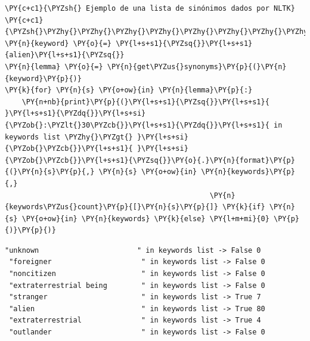     \begin{tcolorbox}[breakable, size=fbox, boxrule=1pt, pad at break*=1mm,colback=cellbackground, colframe=cellborder]
\begin{Verbatim}[commandchars=\\\{\}]
\PY{c+c1}{\PYZsh{} Ejemplo de una lista de sinónimos dados por NLTK}
\PY{c+c1}{\PYZsh{}\PYZhy{}\PYZhy{}\PYZhy{}\PYZhy{}\PYZhy{}\PYZhy{}\PYZhy{}\PYZhy{}\PYZhy{}\PYZhy{}\PYZhy{}\PYZhy{}\PYZhy{}\PYZhy{}\PYZhy{}\PYZhy{}\PYZhy{}\PYZhy{}\PYZhy{}\PYZhy{}\PYZhy{}\PYZhy{}\PYZhy{}\PYZhy{}\PYZhy{}\PYZhy{}\PYZhy{}\PYZhy{}\PYZhy{}\PYZhy{}\PYZhy{}\PYZhy{}\PYZhy{}\PYZhy{}\PYZhy{}\PYZhy{}\PYZhy{}\PYZhy{}\PYZhy{}\PYZhy{}\PYZhy{}\PYZhy{}\PYZhy{}\PYZhy{}\PYZhy{}\PYZhy{}\PYZhy{}\PYZhy{}\PYZhy{}\PYZhy{}\PYZhy{}}
\PY{n}{keyword} \PY{o}{=} \PY{l+s+s1}{\PYZsq{}}\PY{l+s+s1}{alien}\PY{l+s+s1}{\PYZsq{}}
\PY{n}{lemma} \PY{o}{=} \PY{n}{get\PYZus{}synonyms}\PY{p}{(}\PY{n}{keyword}\PY{p}{)}
\PY{k}{for} \PY{n}{s} \PY{o+ow}{in} \PY{n}{lemma}\PY{p}{:}
    \PY{n+nb}{print}\PY{p}{(}\PY{l+s+s1}{\PYZsq{}}\PY{l+s+s1}{ }\PY{l+s+s1}{\PYZdq{}}\PY{l+s+si}{\PYZob{}:\PYZlt{}30\PYZcb{}}\PY{l+s+s1}{\PYZdq{}}\PY{l+s+s1}{ in keywords list \PYZhy{}\PYZgt{} }\PY{l+s+si}{\PYZob{}\PYZcb{}}\PY{l+s+s1}{ }\PY{l+s+si}{\PYZob{}\PYZcb{}}\PY{l+s+s1}{\PYZsq{}}\PY{o}{.}\PY{n}{format}\PY{p}{(}\PY{n}{s}\PY{p}{,} \PY{n}{s} \PY{o+ow}{in} \PY{n}{keywords}\PY{p}{,}
                                                \PY{n}{keywords\PYZus{}count}\PY{p}{[}\PY{n}{s}\PY{p}{]} \PY{k}{if} \PY{n}{s} \PY{o+ow}{in} \PY{n}{keywords} \PY{k}{else} \PY{l+m+mi}{0} \PY{p}{)}\PY{p}{)}
\end{Verbatim}
\end{tcolorbox}

    \begin{Verbatim}[commandchars=\\\{\}]
 "unknown                       " in keywords list -> False 0
 "foreigner                     " in keywords list -> False 0
 "noncitizen                    " in keywords list -> False 0
 "extraterrestrial being        " in keywords list -> False 0
 "stranger                      " in keywords list -> True 7
 "alien                         " in keywords list -> True 80
 "extraterrestrial              " in keywords list -> True 4
 "outlander                     " in keywords list -> False 0
\end{Verbatim}

